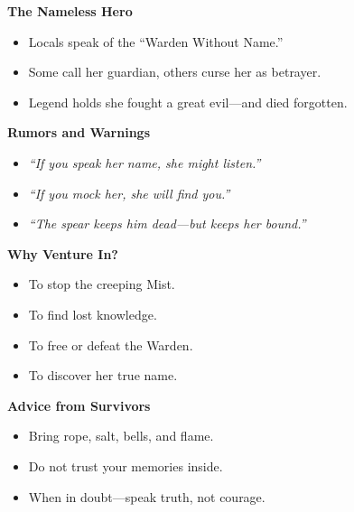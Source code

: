 \documentclass[11pt]{article}
\begin{document}
    \vspace{0.6em}
    
    \noindent
    \textbf{The Nameless Hero}
    \begin{itemize}
        \item Locals speak of the ``Warden Without Name.''
        \item Some call her guardian, others curse her as betrayer.
        \item Legend holds she fought a great evil---and died forgotten.
    \end{itemize}
    
    \vspace{0.6em}
    
    \noindent
    \textbf{Rumors and Warnings}
    \begin{itemize}
        \item \textit{``If you speak her name, she might listen.''}
        \item \textit{``If you mock her, she will find you.''}
        \item \textit{``The spear keeps him dead---but keeps her bound.''}
    \end{itemize}
    
    \vspace{0.6em}
    
    \noindent
    \textbf{Why Venture In?}
    \begin{itemize}
        \item To stop the creeping Mist.
        \item To find lost knowledge.
        \item To free or defeat the Warden.
        \item To discover her true name.
    \end{itemize}
    
    \vspace{0.8em}
    
    \noindent
    \textbf{Advice from Survivors}
    \begin{itemize}
        \item Bring rope, salt, bells, and flame.
        \item Do not trust your memories inside.
        \item When in doubt---speak truth, not courage.
    \end{itemize}
    
    \vspace{1.0em}
    
\end{document}
